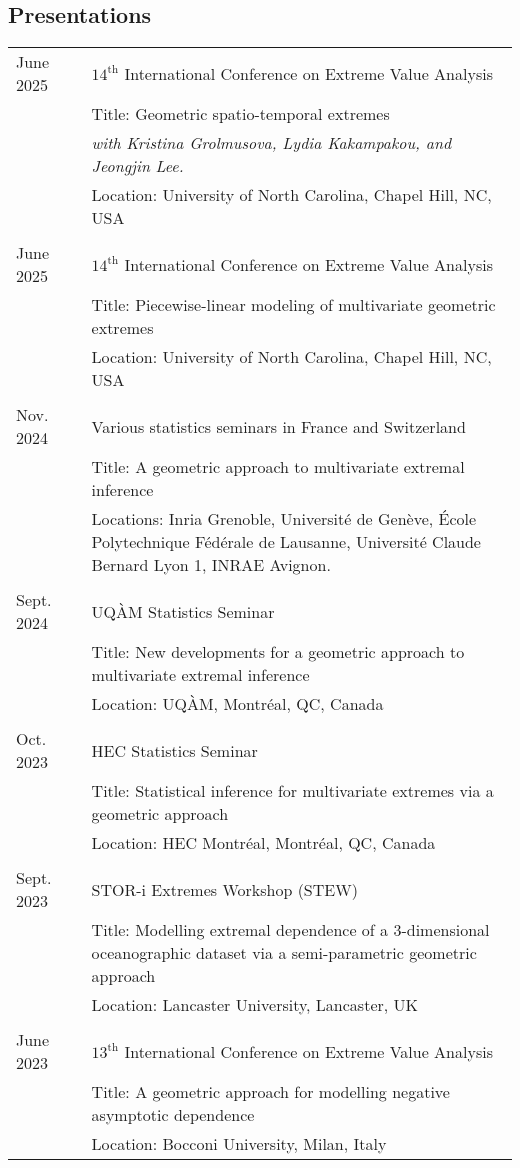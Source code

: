 \documentclass[11pt,]{scrartcl}
\begin{document}
\subsection{Presentations}
\begin{table}[h]
{\def\arraystretch{1.1}\tabcolsep=0pt
\begin{tabular}{p{0.15\linewidth}p{0.85\linewidth}}
{June 2025} & $14^{\text{th}}$ International Conference on Extreme Value Analysis
\\
& Title: Geometric spatio-temporal extremes\\
& \textit{with Kristina Grolmusova, Lydia Kakampakou, and Jeongjin Lee.}\\
  & Location: University of North Carolina, Chapel Hill, NC, USA\\ \\
{June 2025} & $14^{\text{th}}$ International Conference on Extreme Value Analysis
\\
& Title: Piecewise-linear modeling of multivariate geometric extremes\\
  & Location: University of North Carolina, Chapel Hill, NC, USA\\ \\
{Nov. 2024} & Various statistics seminars in France and Switzerland
\\
& Title: A geometric approach to
multivariate extremal inference\\
  & Locations: Inria Grenoble, Université de Genève, École Polytechnique Fédérale de Lausanne, Université Claude Bernard Lyon 1, INRAE Avignon.\\ \\
{Sept. 2024} & UQÀM Statistics Seminar
\\
& Title: New developments for a geometric approach to
multivariate extremal inference\\
  & Location: UQÀM, Montr\'{e}al, QC, Canada\\ \\
{Oct. 2023} & HEC Statistics Seminar
\\
& Title: Statistical inference for multivariate extremes via a geometric approach\\
  & Location: HEC Montr\'{e}al, Montr\'{e}al, QC, Canada\\ \\

  {Sept. 2023} & STOR-i Extremes Workshop (STEW)
\\
& Title: Modelling extremal dependence of a 3-dimensional oceanographic dataset via a semi-parametric geometric approach\\
  & Location: Lancaster University, Lancaster, UK\\ \\

  {June 2023} & $13^{\text{th}}$ International Conference on Extreme Value Analysis
\\
& Title: A geometric approach for modelling negative asymptotic dependence\\
  & Location: Bocconi University, Milan, Italy\\

\end{tabular}%
}
\end{table}
\end{document}
